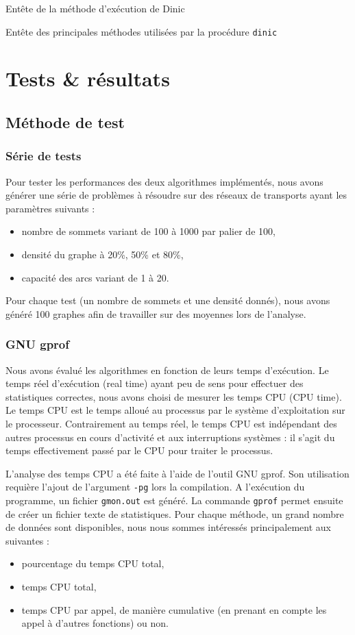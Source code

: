 Entête de la méthode d'exécution de Dinic


Entête des principales méthodes utilisées par la procédure \texttt{dinic}


\section{Tests \& résultats}

\subsection{Méthode de test}

\subsubsection{Série de tests}
Pour tester les performances des deux algorithmes implémentés, nous avons générer une série de problèmes à résoudre sur des réseaux de transports ayant les paramètres suivants :
\begin{itemize}
\item nombre de sommets variant de 100 à 1000 par palier de 100,
\item densité du graphe à 20\%, 50\% et 80\%,
\item capacité des arcs variant de 1 à 20.
\end{itemize}
Pour chaque test (un nombre de sommets et une densité donnés), nous avons généré 100 graphes afin de travailler sur des moyennes lors de l'analyse.

\subsubsection{GNU gprof}
Nous avons évalué les algorithmes en fonction de leurs temps d'exécution. Le temps réel d'exécution (real time) ayant peu de sens pour effectuer des statistiques correctes, nous avons choisi de mesurer les temps CPU (CPU time). Le temps CPU est le temps alloué au processus par le système d'exploitation sur le processeur. Contrairement au temps réel, le temps CPU est indépendant des autres processus en cours d'activité et aux interruptions systèmes : il s'agit du temps effectivement passé par le CPU pour traiter le processus.

L'analyse des temps CPU a été faite à l'aide de l'outil GNU gprof. Son utilisation requière l'ajout de l'argument \texttt{-pg} lors la compilation. A l'exécution du programme, un fichier \texttt{gmon.out} est généré. La commande \texttt{gprof} permet ensuite de créer un fichier texte de statistiques. Pour chaque méthode, un grand nombre de données sont disponibles, nous nous sommes intéressés principalement aux suivantes :
\begin{itemize}
\item pourcentage du temps CPU total,
\item temps CPU total,
\item temps CPU par appel, de manière cumulative (en prenant en compte les appel à d'autres fonctions) ou non.
\end{itemize}

